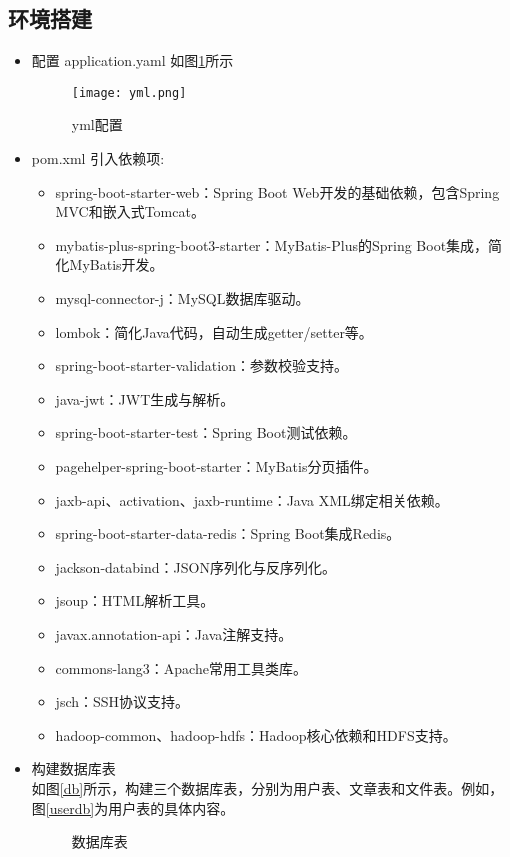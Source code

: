 \documentclass[bachelor]{thesis-uestc}
\begin{document}
\subsection{环境搭建}
\begin{itemize}
    \item 配置 application.yaml
    如图\ref{yml}所示
    \begin{figure}[htbp]
    \centering
    \texttt{[image: yml.png]}
    \caption{yml配置}
    \label{yml}
\end{figure}
    \item pom.xml
    引入依赖项:
    \begin{itemize}
    \item spring-boot-starter-web：Spring Boot Web开发的基础依赖，包含Spring MVC和嵌入式Tomcat。
    \item mybatis-plus-spring-boot3-starter：MyBatis-Plus的Spring Boot集成，简化MyBatis开发。
    \item mysql-connector-j：MySQL数据库驱动。
    \item lombok：简化Java代码，自动生成getter/setter等。
    \item spring-boot-starter-validation：参数校验支持。
    \item java-jwt：JWT生成与解析。
    \item spring-boot-starter-test：Spring Boot测试依赖。
    \item pagehelper-spring-boot-starter：MyBatis分页插件。
    \item jaxb-api、activation、jaxb-runtime：Java XML绑定相关依赖。
    \item spring-boot-starter-data-redis：Spring Boot集成Redis。
    \item jackson-databind：JSON序列化与反序列化。
    \item jsoup：HTML解析工具。
    \item javax.annotation-api：Java注解支持。
    \item commons-lang3：Apache常用工具类库。
    \item jsch：SSH协议支持。
    \item hadoop-common、hadoop-hdfs：Hadoop核心依赖和HDFS支持。
    \end{itemize}
 \item 构建数据库表\\
 如图\ref{db}所示，构建三个数据库表，分别为用户表、文章表和文件表。例如，图\ref{userdb}为用户表的具体内容。


\begin{figure}[htbp]
    \centering %
    \hfill %
    \caption{数据库表} %
    \label{dbdb} %
\end{figure}


\end{itemize}
\end{document}
